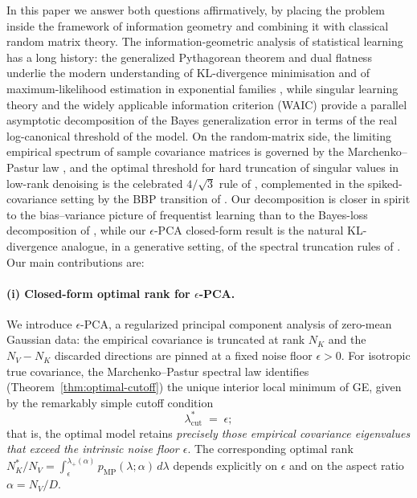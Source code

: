 \documentclass[11pt,a4paper]{article}
\theoremstyle{definition}
\theoremstyle{remark}
\newcommand{\NK}{N_K}
\newcommand{\NV}{N_V}
\begin{document}
In this paper we answer both questions affirmatively, by placing
the problem inside the framework of information geometry
\cite{AmariNagaoka2000,Amari2016} and combining it with classical
random matrix theory. The information-geometric analysis of
statistical learning has a long history: the generalized
Pythagorean theorem and dual flatness underlie the modern
understanding of KL-divergence minimisation \cite{Csiszar1975}
and of maximum-likelihood estimation in exponential families
\cite{Amari2016}, while singular learning theory and the widely
applicable information criterion (WAIC) \cite{Watanabe2010}
provide a parallel asymptotic decomposition of the Bayes
generalization error in terms of the real log-canonical threshold
of the model. On the random-matrix side, the limiting empirical
spectrum of sample covariance matrices is governed by the
Marchenko--Pastur law
\cite{MarchenkoPastur1967,BaiSilverstein2010,Edelman1988},
and the optimal threshold for hard truncation of singular values
in low-rank denoising is the celebrated $4/\sqrt{3}$ rule of
\cite{GavishDonoho2014}, complemented in the spiked-covariance
setting by the BBP transition of
\cite{BaikBenArousPeche2005,Paul2007,BenaychGeorgesNadakuditi2011}.
Our
decomposition is closer in spirit to the bias--variance picture of
frequentist learning than to the Bayes-loss decomposition of
\cite{Watanabe2010}, while our $\epsilon$-PCA closed-form result is
the natural KL-divergence analogue, in a generative setting, of the
spectral truncation rules of
\cite{GavishDonoho2014,Veraart2016MPPCA}.
Our main contributions are:

\paragraph{(i) Closed-form optimal rank for $\epsilon$-PCA.}
We introduce $\epsilon$-PCA, a regularized principal component
analysis of zero-mean Gaussian data: the empirical covariance
is truncated at rank $\NK$ and the $\NV - \NK$ discarded
directions are pinned at a fixed noise floor $\epsilon > 0$.
For isotropic true covariance, the Marchenko--Pastur spectral
law identifies (Theorem~\ref{thm:optimal-cutoff}) the unique
interior local minimum of GE, given by the remarkably simple
cutoff condition
\begin{equation}
  \lambda_{\mathrm{cut}}^{*} \;=\; \epsilon ;
  \label{eq:optcut-intro}
\end{equation}
that is, the optimal model retains \emph{precisely those empirical
covariance eigenvalues that exceed the intrinsic noise floor
$\epsilon$}. The corresponding optimal rank
$\NK^{*}/\NV = \int_{\epsilon}^{\lambda_{+}(\alpha)}
p_{\mathrm{MP}}(\lambda;\alpha)\,d\lambda$ depends explicitly on
$\epsilon$ and on the aspect ratio $\alpha = \NV/D$.
\end{document}

